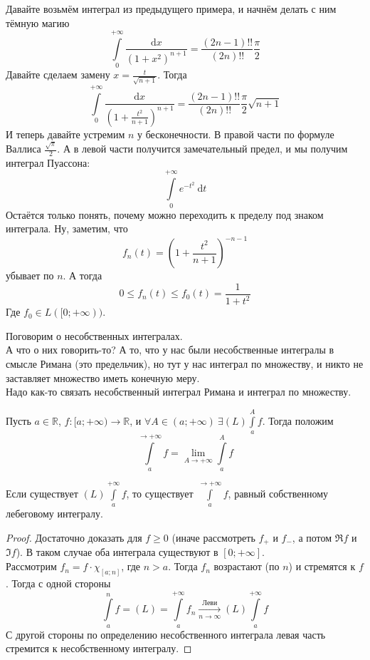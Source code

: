 \documentclass{article}
\begin{document}
    \begin{example}
        Давайте возьмём интеграл из предыдущего примера, и начнём делать с ним тёмную магию
        $$
        \int\limits_0^{+\infty}\frac{\mathrm dx}{(1+x^2)^{n+1}}=\frac{(2n-1)!!}{(2n)!!}\frac\pi2
        $$
        Давайте сделаем замену $x=\frac t{\sqrt{n+1}}$. Тогда
        $$
        \int\limits_0^{+\infty}\frac{\mathrm dx}{(1+\frac{t^2}{n+1})^{n+1}}=\frac{(2n-1)!!}{(2n)!!}\frac\pi2\sqrt{n+1}
        $$
        И теперь давайте устремим $n$ у бесконечности. В правой части по формуле Валлиса $\frac{\sqrt\pi}2$. А в левой части получится замечательный предел, и мы получим интеграл Пуассона:
        $$
        \int\limits_0^{+\infty}e^{-t^2}~\mathrm dt
        $$
        Остаётся только понять, почему можно переходить к пределу под знаком интеграла. Ну, заметим, что
        $$
        f_n(t)=\left(1+\frac{t^2}{n+1}\right)^{-n-1}
        $$
        убывает по $n$. А тогда 
        $$
        0\leqslant f_n(t)\leqslant f_0(t)=\frac1{1+t^2}
        $$
        Где $f_0\in L([0;+\infty))$.
    \end{example}
    \begin{remark}
        Поговорим о несобственных интегралах.\\
        А что о них говорить-то? А то, что у нас были несобственные интегралы в смысле Римана (это предельчик), но тут у нас интеграл по множеству, и никто не заставляет множество иметь конечную меру.\\
        Надо как-то связать несобственный интеграл Римана и интеграл по множеству.
    \end{remark}
    \begin{definition}
        Пусть $a\in\mathbb R$, $f\colon [a;+\infty)\to\mathbb R$, и $\forall A\in(a;+\infty)~\exists (L)\int\limits_a^Af$. Тогда положим
        $$
        \int\limits_a^{\to+\infty}f=\lim\limits_{A\to+\infty}\int\limits_a^Af
        $$
    \end{definition}
    \begin{lemma}
        Если существует $(L)\int\limits_a^{+\infty}f$, то существует $\int\limits_a^{\to+\infty} f$, равный собственному лебеговому интегралу.
    \end{lemma}
    \begin{proof}
        Достаточно доказать для $f\geqslant 0$ (иначе рассмотреть $f_+$ и $f_-$, а потом $\Re f$ и $\Im f$). В таком случае оба интеграла существуют в $[0;+\infty]$.\\
        Рассмотрим $f_n=f\cdot\chi_{[a;n]}$, где $n>a$. Тогда $f_n$ возрастают (по $n$) и стремятся к $f$. Тогда с одной стороны
        $$
        \int\limits_a^nf=(L)=\int\limits_a^{+\infty}f_n\underset{n\to\infty}{\overset{\text{Леви}}\longrightarrow}(L)\int\limits_a^{+\infty}f
        $$
        С другой стороны по определению несобственного интеграла левая часть стремится к несобственному интегралу.
    \end{proof}
\end{document}
